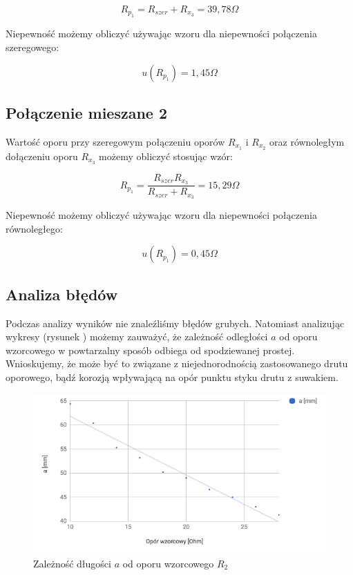 \documentclass[a4paper,10pt,twoside]{article}
\begin{document}
$$ R_{p_1} = R_{szer} + R_{x_3} = 39,78 \unit{\Omega} $$

Niepewność możemy obliczyć używając wzoru dla niepewności połączenia szeregowego:

$$ u(R_{p_1}) = 1,45 \unit{\Omega} $$

\subsection{Połączenie mieszane 2}

Wartość oporu przy szeregowym połączeniu oporów $R_{x_1}$ i $R_{x_2}$ oraz równoległym dołączeniu oporu $R_{x_3}$ możemy obliczyć stosując wzór:

$$ R_{p_1} = \frac{R_{szer} R_{x_3}}{R_{szer} + R_{x_3}} = 15,29 \unit{\Omega} $$

Niepewność możemy obliczyć używając wzoru dla niepewności połączenia równoległego:

$$ u(R_{p_1}) = 0,45 \unit{\Omega} $$

\subsection{Analiza błędów}

Podczas analizy wyników nie znaleźliśmy błędów grubych. Natomiast analizując wykresy (rysunek ) możemy zauważyć, że zależność odległości $a$ od oporu wzorcowego w powtarzalny sposób odbiega od spodziewanej prostej. Wnioskujemy, że może być to związane z niejednorodnością zastosowanego drutu oporowego, bądź korozją wpływającą na opór punktu styku drutu z suwakiem.

\begin{figure}[!htp]
\centerline{\includegraphics[scale=0.5]{wykres_r2.png}}
\caption{Zależność długości $a$ od oporu wzorcowego $R_2$}
\label{fig:wykres_r2}
\end{figure}
\end{document}
